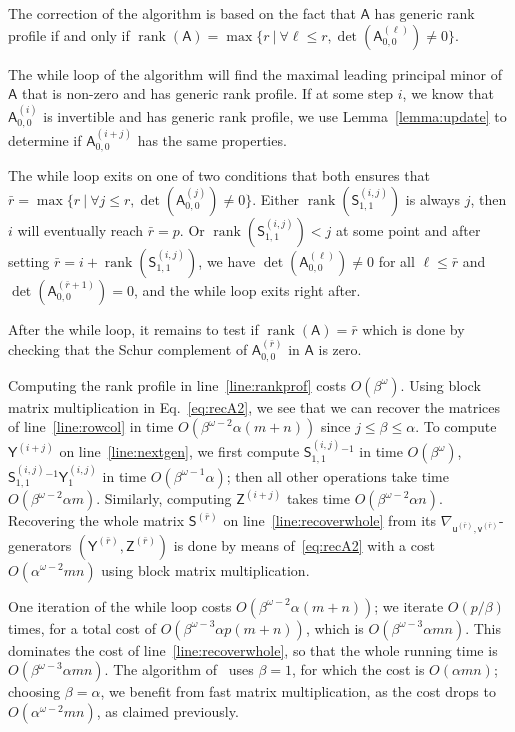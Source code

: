 \documentclass{sig-alternate}
\newcommand{\vu}{\ensuremath{\mathsf{u}}}
\newcommand{\vv}{\ensuremath{\mathsf{v}}}
\newcommand{\mA}{\ensuremath{\mathsf{A}}}
\newcommand{\mS}{\ensuremath{\mathsf{S}}}
\newcommand{\mY}{\ensuremath{\mathsf{Y}}}
\newcommand{\mZ}{\ensuremath{\mathsf{Z}}}
\newcommand{\rank}{\ensuremath{\operatorname{rank}}}
\begin{document}
\smallskip{}
The correction of the algorithm is based on the fact that $\mA$ has
generic rank profile if and only if
$\rank(\mA) = \max\{ r \ |\  \forall \ell \leq r, \det(\mA^{(\ell)}_{0,0}) \neq
0 \}$.

The while loop of the algorithm will find the maximal leading
principal minor of $\mA$ that is non-zero and has generic rank
profile. If at some step $i$, we know that $\mA^{(i)}_{0,0}$ is
invertible and has generic rank profile, we use
Lemma~\ref{lemma:update} to determine if $\mA^{(i+j)}_{0,0}$ has the
same properties.

The while loop exits on one of two conditions that both ensures that
$\bar{r} = \max\{ r \ |\ \forall j \leq r, \det(\mA^{(j)}_{0,0}) \neq
0 \}$.
Either $\rank(\mS^{(i,j)}_{1,1})$ is always $j$, then $i$ will
eventually reach $\bar{r}=p$. Or $\rank(\mS^{(i,j)}_{1,1})<j$ at some
point and after setting $\bar{r}=i+\rank( \mS^{(i,j)}_{1,1})$, we
have $\det(\mA^{(\ell)}_{0,0}) \neq 0$ for all $\ell \leq \bar{r}$
and $\det(\mA^{(\bar{r}+1)}_{0,0}) = 0$, and the while loop exits
right after.

After the while loop, it remains to test if $\rank(\mA) = \bar{r}$
which is done by checking that the Schur complement of
$\mA^{(\bar{r})}_{0,0}$ in $\mA$ is zero.

\smallskip{} Computing the rank profile
in line~\ref{line:rankprof} costs $O(\beta^\omega)$.  Using block
matrix multiplication in Eq.~\eqref{eq:recA2}, we see that we can
recover the matrices of line~\ref{line:rowcol} in time
$O(\beta^{\omega-2} \alpha (m+n))$ since $j \le \beta \le \alpha$.  To
compute $\mY^{(i+j)}$ on line~\ref{line:nextgen}, we first compute
$\mS^{(i,j)}_{1,1}{}^{-1}$ in time $O(\beta^{\omega})$,
$\mS^{(i,j)}_{1,1}{}^{-1} \mY^{(i,j)}_1$ in time
$O(\beta^{\omega-1} \alpha)$; then all other operations take time
$O(\beta^{\omega-2} \alpha m)$.  Similarly, computing $\mZ^{(i+j)}$
takes time $O(\beta^{\omega-2} \alpha n)$.  Recovering the whole
matrix $\mS^{(\bar{r})}$ on line~\ref{line:recoverwhole} from its
$\nabla_{\vu^{(\bar{r})},\vv^{(\bar{r})}}$-generators
$(\mY^{(\bar{r})},\mZ^{(\bar{r})})$ is done by means
of~\eqref{eq:recA2} with a cost $O(\alpha^{\omega-2} mn)$ using block
matrix multiplication.

One iteration of the while loop costs
$O(\beta^{\omega-2} \alpha (m+n))$; we iterate $O(p/\beta)$ times, for
a total cost of $O(\beta^{\omega-3} \alpha p(m+n))$, which is
$O(\beta^{\omega-3} \alpha mn)$. This dominates the cost of
line~\ref{line:recoverwhole}, so that the whole running time is
$O(\beta^{\omega-3} \alpha mn)$. The algorithm of~\cite{Mouilleron08}
uses $\beta=1$, for which the cost is $O(\alpha mn)$; choosing
$\beta=\alpha$, we benefit from fast matrix multiplication, as the
cost drops to $O(\alpha^{\omega-2} mn)$, as claimed previously.
\end{document}
